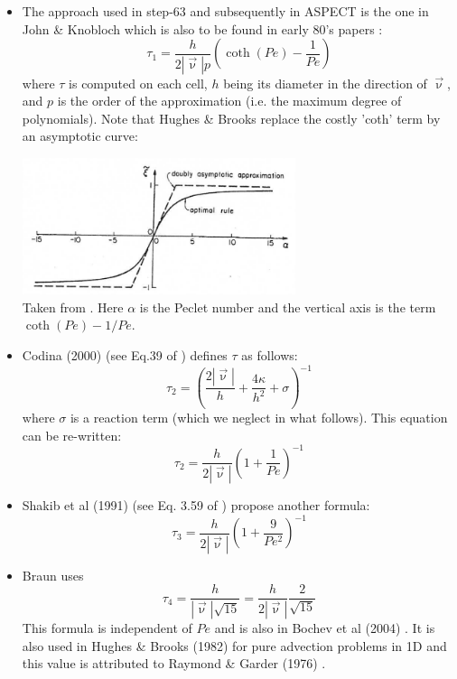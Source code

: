 \begin{itemize}
\item The approach used in step-63 and subsequently in ASPECT is the 
one in John \& Knobloch \cite{jokn06,knob08} which is also to be found in early 
80's papers \cite{brhu82,hubr82}:
\[
\tau_1 = \frac{h}{2 |\vec\upnu| p} \left( \coth (Pe) - \frac{1}{Pe} \right)
\]
where $\tau$ is computed on each cell, $h$ being its diameter in the direction of $\vec\upnu$, 
and $p$ is the order of the approximation (i.e. the maximum degree of polynomials).
Note that Hughes \& Brooks \cite{hubr82} replace the costly 'coth' term by an asymptotic curve:

\begin{center}
\includegraphics[width=8cm]{images/supg/hubr82}\\
{\captionfont Taken from \cite{hubr82}. Here $\alpha$ is the Peclet number and the vertical axis
is the term $ \coth (Pe) -1/Pe$.}
\end{center}


\item
Codina (2000) (see Eq.39 of \cite{codi00}) defines $\tau$ as follows:
\[
\tau_2= \left( \frac{2 |\vec\upnu|}{h} + \frac{4 \kappa}{h^2} + \sigma   \right)^{-1}
\]
where $\sigma$ is a reaction term (which we neglect in what follows). This equation 
can be re-written:
\[
\tau_2= \frac{h}{2 |\vec\upnu|} \left( 1 + \frac{1}{Pe} \right)^{-1}
\]

\item
Shakib et al (1991) (see Eq. 3.59 of \cite{shhj91}) propose another formula:
\[
\tau_3= \frac{h}{2 |\vec\upnu|} \left( 1 + \frac{9}{Pe^2} \right)^{-1}
\]

\item
Braun \cite{brau03} uses 
\[
\tau_4 = \frac{h}{|\vec\upnu| \sqrt{15}} = \frac{h}{2|\vec\upnu|} \frac{2}{\sqrt{15}} 
\]
This formula is independent of $Pe$ and is also in Bochev et al (2004) \cite{bogs04}.
It is also used in Hughes \& Brooks (1982) \cite{hubr82} for pure advection problems in 1D
and this value is attributed to Raymond \& Garder (1976)  \cite{raga76}.


\end{itemize}
